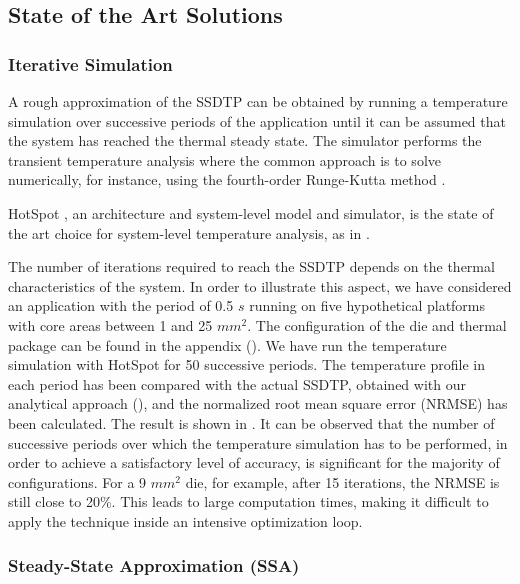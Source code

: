 \subsection{State of the Art Solutions}

\subsubsection{Iterative Simulation}

A rough approximation of the SSDTP can be obtained by running a temperature
simulation over successive periods of the application until it can be assumed
that the system has reached the thermal steady state. The simulator performs the
transient temperature analysis where the common approach is to solve
 numerically, for instance, using the
fourth-order Runge-Kutta method \cite{press2007}.

HotSpot \cite{skadron2003}, an architecture and system-level model and
simulator, is the state of the art choice for system-level temperature analysis,
as in \cite{srinivasan2004, liao2005, coskun2006, liu2007, huang2009, xiang2010,
thiele2011}.

The number of iterations required to reach the SSDTP depends on the thermal
characteristics of the system. In order to illustrate this aspect, we have
considered an application with the period of 0.5 $s$ running on five
hypothetical platforms with core areas between 1 and 25 $mm^2$. The
configuration of the die and thermal package can be found in the appendix
(). We have run the temperature simulation with HotSpot
\cite{skadron2003} for 50 successive periods. The temperature profile in each
period has been compared with the actual SSDTP, obtained with our analytical
approach (), and the normalized root mean square error
(NRMSE) has been calculated. The result is shown in . It can
be observed that the number of successive periods over which the temperature
simulation has to be performed, in order to achieve a satisfactory level of
accuracy, is significant for the majority of configurations. For a 9 $mm^2$ die,
for example, after 15 iterations, the NRMSE is still close to 20\%. This leads
to large computation times, making it difficult to apply the technique inside an
intensive optimization loop.

\subsubsection{Steady-State Approximation (SSA)}

